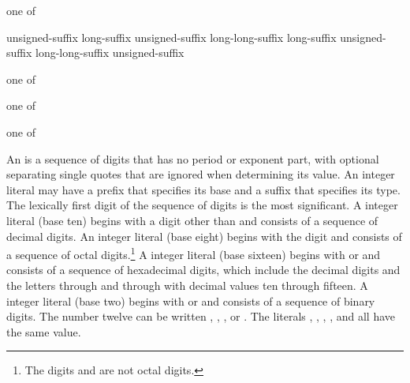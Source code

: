 \begin{bnf}
 \textnormal{one of}\br
    \br
    \br
\end{bnf}

\begin{bnf}
\br
    \br
\end{bnf}

\begin{bnf}
\br
    unsigned-suffix long-suffix\opt \br
    unsigned-suffix long-long-suffix\opt \br
    long-suffix unsigned-suffix\opt \br
    long-long-suffix unsigned-suffix\opt
\end{bnf}

\begin{bnf}
 \textnormal{one of}\br
\end{bnf}

\begin{bnf}
 \textnormal{one of}\br
\end{bnf}

\begin{bnf}
 \textnormal{one of}\br
\end{bnf}

\pnum
{}%
%
%
%
%
%
%
%
An  is a sequence of digits that has no period
or exponent part, with optional separating single quotes that are ignored
when determining its value. An integer literal may have a prefix that specifies
its base and a suffix that specifies its type. The lexically first digit
of the sequence of digits is the most significant. A 
integer literal (base ten) begins with a digit other than  and
consists of a sequence of decimal digits. An  integer
literal (base eight) begins with the digit  and consists of a
sequence of octal digits.\footnote{The digits  and  are not octal digits. }
A  integer literal (base sixteen) begins with
 or  and consists of a sequence of hexadecimal
digits, which include the decimal digits and the letters 
through  and  through  with decimal values
ten through fifteen. A  integer literal (base two) begins with
 or  and consists of a sequence of binary digits.
\enterexample The number twelve can be written , ,
, or . The literals ,
, , , and
 all have the same value.
\exitexample

